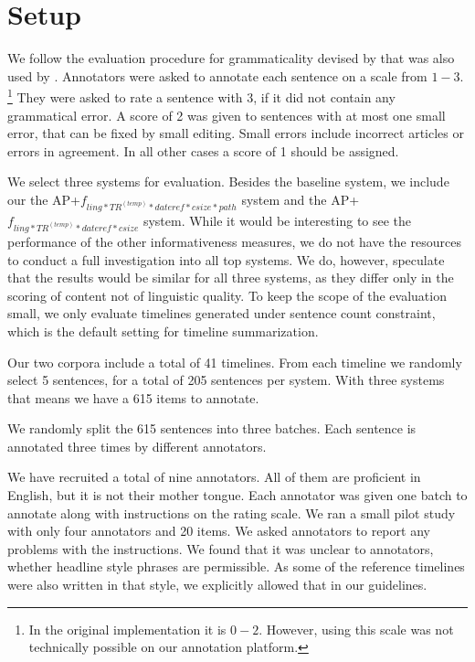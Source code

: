 \documentclass[a4paper,BCOR=10mm]{report}
\numberwithin{lemma}{chapter}
\numberwithin{definition}{chapter}
\begin{document}
\section{Setup}

We follow the evaluation procedure for grammaticality devised by \citet{mckeown} that was also used by \citet{filippova}.
Annotators were asked to annotate each sentence on a scale from $1-3$. \footnote{In the original implementation it is $0-2$. However, using this scale was not technically possible on our annotation platform.} They were asked to rate a sentence with 3, if it did not contain any grammatical error. A score of 2 was given to sentences with at most one small error, that can be fixed by small editing. Small errors include incorrect articles or errors in agreement. In all other cases a score of 1 should be assigned.

We select three systems for evaluation. Besides the baseline system, we include our the AP+$f_{ ling*TR^{(temp)}*\mathit{dateref}*\mathit{csize}*\mathit{path} }$ system and the AP+$f_{ ling*TR^{(temp)}*\mathit{dateref}*\mathit{csize} }$ system. While it would be interesting to see the performance of the other informativeness measures, we do not have the resources to conduct a full investigation into all top systems.
We do, however, speculate that the results would be similar for all three systems, as they differ only in the scoring of content not of linguistic quality.
To keep the scope of the evaluation small, we only evaluate timelines generated under sentence count constraint, which is the default setting for timeline summarization.

Our two corpora include a total of 41 timelines.
From each timeline we randomly select 5 sentences, for a total of 205 sentences per system.
With three systems that means we have a 615 items to annotate.

We randomly split the 615 sentences into three batches. Each sentence is annotated three times by different annotators.

We have recruited a total of nine annotators. All of them are proficient in English, but it is not their mother tongue.
Each annotator was given one batch to annotate along with instructions on the rating scale. We ran a small pilot study with only four annotators and 20 items. We asked annotators to report any problems with the instructions. We found that it was unclear to annotators, whether headline style phrases are permissible.
As some of the reference timelines were also written in that style, we explicitly allowed that in our guidelines.
\end{document}
